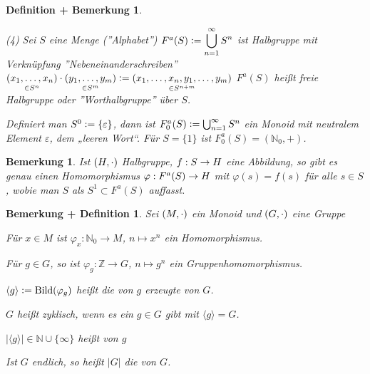 \documentclass[a4paper,10pt,german]{scrbook}
\theoremstyle{saetze}
\theoremstyle{definitionen}
\newtheorem{DefBem}[Def]{Definition + Bemerkung}
\newtheorem{Bem}[Def]{Bemerkung}
\newtheorem{BemDef}[Def]{Bemerkung + Definition}
\begin{document}
\begin{DefBem}
\begin{enum}
\end{enum}
\begin{enum}
\item[(4)] Sei $S$ eine Menge (''Alphabet'') $F^a(S) \mathrel{\mathop:}=
\displaystyle \bigcup^{\infty}_{n=1} S^n$ ist Halbgruppe mit Verknüpfung
''Nebeneinanderschreiben'' $\underset{\in S^n}{(x_1,\dots,x_n)}\cdot
\underset{\in S^m}{(y_1,\dots,y_m)} \mathrel{\mathop:}= \underset{\in
S^{n+m}}{(x_1, \dots, x_n, y_1, \dots, y_m)}$ $F^a(S)$ heißt freie Halbgruppe oder ''Worthalbgruppe'' über
$S$.

Definiert man $S^0 \mathrel{\mathop:}= \{\varepsilon\}$, dann ist $F_0^a(S) \mathrel{\mathop:}= \bigcup_{n=1}^\infty S^n$ ein Monoid mit neutralem Element $\varepsilon$, dem „leeren Wort“. Für $S=\{1\}$ ist $F_0^a(S) = (\mathbb N_0,+)$.
\end{enum}
\end{DefBem}

\begin{Bem} 
Ist $(H,\cdot)$ Halbgruppe, $f:S\rightarrow H$ eine
Abbildung, so gibt es genau einen Homomorphismus $\varphi:F^a(S) \rightarrow H$
mit $\varphi(s) = f(s)$ für alle $s\in S$, wobie man $S$ als $S^1\subset F^a(S)$ auffasst.

\end{Bem}

\begin{BemDef}
\label{1.9}
Sei $(M,\cdot)$ ein Monoid und $(G,\cdot)$ eine Gruppe
\begin{enum} 

\item Für $x \in M$ ist $\varphi_x: \mathbb{N}_0
\to M$, $n \mapsto x^n$ ein Homomorphismus.

\item Für $g \in G$, so ist $\varphi_g: \mathbb{Z} \to G$, $n \mapsto g^n$
ein Gruppenhomomorphismus.

\item $\langle g \rangle \mathrel{\mathop:}= \mathop{\rm Bild}\nolimits(\varphi_g)$ heißt die von
$g$ erzeugte  von $G$.

\item $G$ heißt zyklisch, wenn es ein $g\in G$ gibt mit $\langle g\rangle =G$.

\item $| \langle g \rangle |\in \mathbb N\cup\{\infty\}$ heißt  von $g$

\item Ist $G$ endlich, so heißt $| G |$ die  von $G$.
\end{enum}


\end{BemDef}
\end{document}
